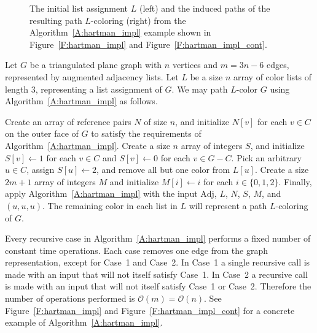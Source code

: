 \documentclass[12pt,letterpaper]{article}
\theoremstyle{plain}
\theoremstyle{definition}
\theoremstyle{break}
\begin{document}
\begin{figure}
\begin{center}
\caption{The initial list assignment $L$ (left) and the induced paths of the
resulting path
$L$-coloring (right)
from the Algorithm~\ref{A:hartman_impl} example shown in
Figure~\ref{F:hartman_impl} and Figure~\ref{F:hartman_impl_cont}.}
\label{F:hartman_impl_comp}
\end{center}
\end{figure}

Let $G$ be a triangulated plane graph with $n$ vertices and $m=3n-6$ edges,
represented by augmented adjacency
lists. Let $L$ be a size $n$ array of color lists of length $3$,
representing a list assignment of $G$. We may path $L$-color $G$ using
Algorithm~\ref{A:hartman_impl} as follows.

Create an array of reference pairs $N$ of size $n$, and initialize $N[v]$
for each $v\in C$ on the outer face of $G$ to satisfy
the requirements of Algorithm~\ref{A:hartman_impl}. Create a size $n$ array of
integers $S$, and initialize $S[v]\leftarrow 1$ for each $v\in C$ and
$S[v]\leftarrow 0$ for each $v\in G-C$. Pick an arbitrary $u\in C$,
assign $S[u]\leftarrow 2$, and remove all but one color from $L[u]$.
Create a size $2m+1$
array of integers $M$ and initialize $M[i]\leftarrow i$ for each
$i\in\{0,1,2\}$.
Finally, apply
Algorithm~\ref{A:hartman_impl} with the input $\text{Adj}$, $L$,
$N$, $S$, $M$, and $(u, u, u)$. The remaining color in each
list in $L$ will represent a path $L$-coloring of $G$.

Every recursive case in Algorithm~\ref{A:hartman_impl} performs a fixed number
of constant time operations. Each case removes one edge from the graph
representation,
except for Case~1 and Case~2. In Case~1 a single recursive call is made
with an input that will not itself satisfy Case~1. In Case~2 a recursive
call is made with an input that will not itself satisfy Case~1 or Case~2.
Therefore the number of operations performed
is $\mathcal{O}(m)=\mathcal{O}(n)$. See Figure~\ref{F:hartman_impl} and
Figure~\ref{F:hartman_impl_cont} for a concrete example of
Algorithm~\ref{A:hartman_impl}.
\end{document}
